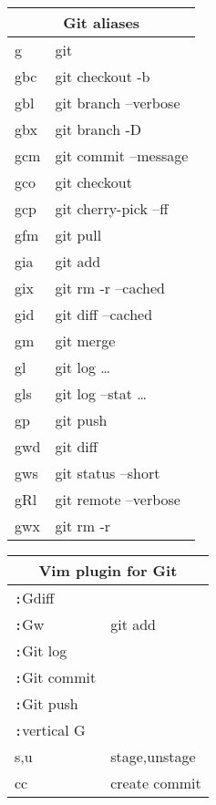 \documentclass[12pt,paper=landscape,paper=a4]{scrartcl}
\begin{document}
\pagestyle{empty}
\pagecolor{Dandelion}

\begin{multicols}{3}

    \begin{tabular}{ll}
        \multicolumn{2}{c}{Git aliases} \\
        \hline
        g    & git\\
        gbc  & git checkout -b\\
        gbl  & git branch --verbose\\
        gbx  & git branch -D\\
        gcm  & git commit --message\\
        gco  & git checkout\\
        gcp  & git cherry-pick --ff\\
        gfm  & git pull\\
        gia  & git add\\
        gix  & git rm -r --cached\\
        gid  & git diff --cached\\
        gm   & git merge\\
        gl   & git log \ldots\\
        gls  & git log --stat \ldots\\
        gp   & git push\\
        gwd  & git diff\\
        gws  & git status --short\\
        gRl  & git remote --verbose\\
        gwx  & git rm -r
    \end{tabular}

    \vspace{1em}

    \begin{tabular}{ll}
        \multicolumn{2}{c}{Vim plugin for Git}\\
        \hline
        \verb!:!Gdiff          & \\
        \verb!:!Gw             & git add\\
        \verb!:!Git log        & \\
        \verb!:!Git commit     & \\
        \verb!:!Git push       & \\
        \verb!:!vertical G     & \\
        s,u  	        & stage,unstage\\
        cc		        & create commit\\
    \end{tabular}


\end{multicols}
\end{document}
